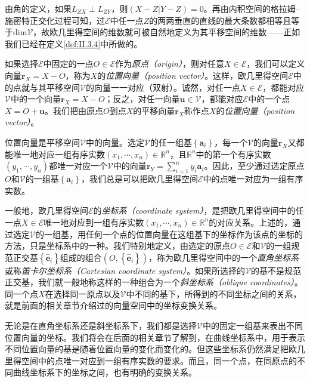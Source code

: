 \documentclass[../main.tex]{subfiles}
\begin{document}
由角的定义，如果$L_{ZX}\perp L_{ZY}$，则$\left(X-Z|Y-Z\right)=0$。再由内积空间的格拉姆--施密特正交化过程可知，过$\mathcal{E}$中任一点$Z$的两两垂直的直线的最大条数都相等且等于$\mathrm{dim}\mathcal{V}$，故欧几里得空间的维数就可被自然地定义为其平移空间的维数——正如我们已经在定义\ref{def:II.3.4}中所做的。

如果选择$\mathcal{E}$中固定的一点$O\in\mathcal{E}$作为\emph{原点（origin）}，则对任意$X\in\mathcal{E}$，我们可以定义向量$\mathbf{r}_X=X-O$，称为$X$的\emph{位置向量（position vector）}。这样，欧几里得空间$\mathcal{E}$中的点就与其平移空间$\mathcal{V}$的向量一一对应（双射）。诚然，对任一点$X\in\mathcal{E}$，都能对应$\mathcal{V}$中的一个向量$\mathbf{r}_X=X-O$；反之，对任一向量$\mathbf{u}\in\mathcal{V}$，都能对应$\mathcal{E}$中的一个点$X=O+\mathbf{u}$。我们把由原点$O$到点$X$的平移向量$\mathbf{r}_X$称作点$X$的\emph{位置向量（position vector）}。

位置向量是平移空间$\mathcal{V}$中的向量。选定$\mathcal{V}$的任一组基$\left\{\mathbf{a}_i\right\}$，每一个$\mathcal{V}$的向量$\mathbf{r}_X$又都能唯一地对应一组有序实数$\left(x_1,\cdots,x_n\right)\in\mathbb{R}^n$，且$\mathbb{R}^n$中的第一个有序实数$\left(y_1,\cdots,y_n\right)$都唯一对应一个$\mathcal{V}$中的向量$\mathbf{r}_Y=\sum_{i=1}^ny_i\mathbf{a}_i$。因此，至少通过选定原点$O$和$\mathcal{V}$的一组基$\left\{\mathbf{a}_i\right\}$，我们总是可以把欧几里得空间$\mathcal{E}$中的点唯一对应为一组有序实数。

一般地，欧几里得空间$\mathcal{E}$的\emph{坐标系（coordinate system）}，是把欧几里得空间中的任一点$X\in\mathcal{E}$唯一地对应到一组有序实数$\left(x_1,\cdots,x_n\right)\in\mathbb{R}^n$的对应关系。上述的，通过选定$\mathcal{V}$的一组基，用任何一个点的位置向量在这组基下的坐标作为该点的坐标的方法，只是坐标系中的一种。我们特别地定义，由选定的原点$O\in\mathcal{E}$和$\mathcal{V}$的一组规范正交基$\left\{\mathbf{\hat{e}}_i\right\}$组成的组合$\left(O,\left\{\mathbf{\hat{e}}_i\right\}\right)$，称为欧几里得空间中的一个\emph{直角坐标系}或称\emph{笛卡尔坐标系（Cartesian coordinate system）}。如果所选择的$\mathcal{V}$的基不是规范正交基，我们就一般地称这样的一种组合为一个\emph{斜坐标系（oblique coordinates）}。同一个点$X$在选择同一原点以及$\mathcal{V}$中不同的基下，所得到的不同坐标之间的关系，就是前面的相关章节介绍过的向量空间中的坐标变换关系。

无论是在直角坐标系还是斜坐标系下，我们都是选择$\mathcal{V}$中的固定一组基来表出不同位置向量的坐标。我们将会在后面的相关章节了解到，在曲线坐标系中，用于表示不同位置向量的基是随着位置向量的变化而变化的。但这些坐标系仍然满足把欧几里得空间中的点唯一对应到一组有序实数的要求。而且，同一个点，在同原点的不同曲线坐标系下的坐标之间，也有明确的变换关系。
\end{document}
